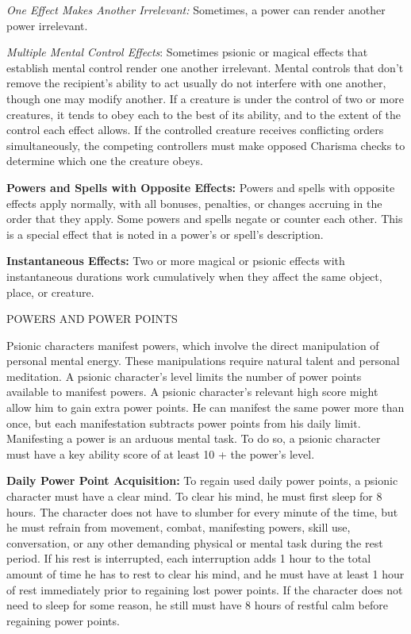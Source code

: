 \documentclass{article}
\begin{document}
\textit{One Effect Makes Another Irrelevant: }Sometimes, a power can render another 
power irrelevant.

\textit{Multiple Mental Control Effects}: Sometimes psionic or magical effects 
that establish mental control render one another irrelevant. Mental controls that 
don't remove the recipient's ability to act usually do not interfere with one another, 
though one may modify another. If a creature is under the control of two or more 
creatures, it tends to obey each to the best of its ability, and to the extent 
of the control each effect allows. If the controlled creature receives conflicting 
orders simultaneously, the competing controllers must make opposed Charisma checks 
to determine which one the creature obeys.

\textbf{Powers and Spells with Opposite Effects:} Powers and spells with opposite 
effects apply normally, with all bonuses, penalties, or changes accruing in the 
order that they apply. Some powers and spells negate or counter each other. This 
is a special effect that is noted in a power's or spell's description.

\textbf{Instantaneous Effects:} Two or more magical or psionic effects with instantaneous 
durations work cumulatively when they affect the same object, place, or creature. 

\vspace{12pt}
{\LARGE{}POWERS AND POWER POINTS}

Psionic characters manifest powers, which involve the direct manipulation of personal 
mental energy. These manipulations require natural talent and personal meditation. 
A psionic character's level limits the number of power points available to manifest 
powers. A psionic character's relevant high score might allow him to gain extra 
power points. He can manifest the same power more than once, but each manifestation 
subtracts power points from his daily limit. Manifesting a power is an arduous 
mental task. To do so, a psionic character must have a key ability score of at 
least 10 + the power's level.

\textbf{Daily Power Point Acquisition:} To regain used daily power points, a psionic 
character must have a clear mind. To clear his mind, he must first sleep for 8 
hours. The character does not have to slumber for every minute of the time, but 
he must refrain from movement, combat, manifesting powers, skill use, conversation, 
or any other demanding physical or mental task during the rest period. If his rest 
is interrupted, each interruption adds 1 hour to the total amount of time he has 
to rest to clear his mind, and he must have at least 1 hour of rest immediately 
prior to regaining lost power points. If the character does not need to sleep for 
some reason, he still must have 8 hours of restful calm before regaining power 
points.
\end{document}
